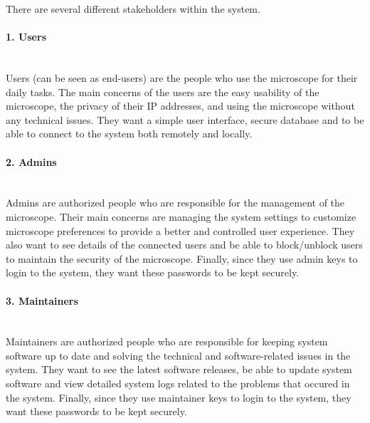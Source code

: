 There are several different stakeholders within the system.

\paragraph*{1. Users} \mbox{}\\
Users (can be seen as end-users) are the people who use the microscope for their daily tasks. The main concerns of the users are the easy usability of the microscope, the privacy of their IP addresses, and using the microscope without any technical issues. They want a simple user interface, secure database and to be able to connect to the system both remotely and locally.

\paragraph*{2. Admins} \mbox{}\\
Admins are authorized people who are responsible for the management of the microscope. Their main concerns are managing the system settings to customize microscope preferences to provide a better and controlled user experience. They also want to see details of the connected users and be able to block/unblock users to maintain the security of the microscope. Finally, since they use admin keys to login to the system, they want these passwords to be kept securely.

\paragraph*{3. Maintainers} \mbox{}\\
Maintainers are authorized people who are responsible for keeping system software up to date and solving the technical and software-related issues in the system. They want to see the latest software releases, be able to update system software and view detailed system logs related to the problems that occured in the system. Finally, since they use maintainer keys to login to the system, they want these passwords to be kept securely.
